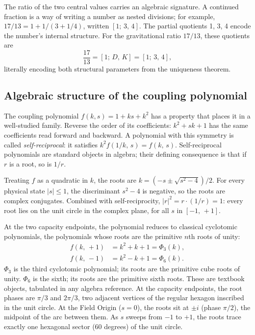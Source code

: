 \documentclass[twocolumn]{iopjournal}
\begin{document}
The ratio of the two central values carries an algebraic signature. A continued fraction is a way of writing a number as nested divisions; for example, $17/13 = 1 + 1/(3 + 1/4)$, written $[1;\, 3,\, 4]$. The partial quotients 1, 3, 4 encode the number's internal structure. For the gravitational ratio $17/13$, these quotients are
\begin{equation}
\frac{17}{13} = [1;\, D,\, K] = [1;\, 3,\, 4],
\end{equation}
literally encoding both structural parameters from the uniqueness theorem.

\subsection{Algebraic structure of the coupling polynomial}

The coupling polynomial $f(k,s) = 1 + ks + k^2$ has a property that places it in a well-studied family. Reverse the order of its coefficients: $k^2 + sk + 1$ has the same coefficients read forward and backward. A polynomial with this symmetry is called \emph{self-reciprocal}: it satisfies $k^2 f(1/k,\,s) = f(k,\,s)$. Self-reciprocal polynomials are standard objects in algebra; their defining consequence is that if $r$ is a root, so is $1/r$.

Treating $f$ as a quadratic in $k$, the roots are $k = (-s \pm \sqrt{s^2 - 4})/2$. For every physical state $|s| \leq 1$, the discriminant $s^2 - 4$ is negative, so the roots are complex conjugates. Combined with self-reciprocity, $|r|^2 = r \cdot (1/r) = 1$: every root lies on the unit circle in the complex plane, for all $s$ in $[-1,\,+1]$.

At the two capacity endpoints, the polynomial reduces to classical cyclotomic polynomials, the polynomials whose roots are the primitive $n$th roots of unity:
\begin{align}
f(k,\,+1) &= k^2 + k + 1 = \Phi_3(k), \nonumber \\
f(k,\,-1) &= k^2 - k + 1 = \Phi_6(k).
\label{eq:cyclotomic}
\end{align}
$\Phi_3$ is the third cyclotomic polynomial; its roots are the primitive cube roots of unity. $\Phi_6$ is the sixth; its roots are the primitive sixth roots. These are textbook objects, tabulated in any algebra reference. At the capacity endpoints, the root phases are $\pi/3$ and $2\pi/3$, two adjacent vertices of the regular hexagon inscribed in the unit circle. At the Field Origin ($s = 0$), the roots sit at $\pm i$ (phase $\pi/2$), the midpoint of the arc between them. As $s$ sweeps from $-1$ to $+1$, the roots trace exactly one hexagonal sector (60 degrees) of the unit circle.
\end{document}
